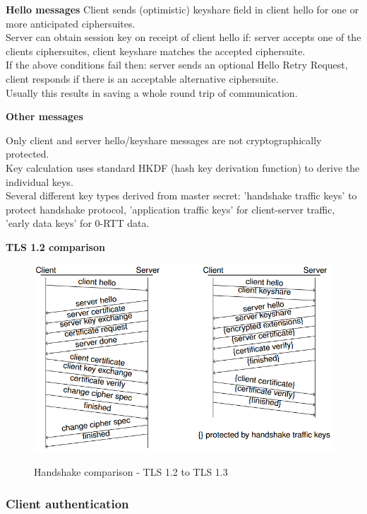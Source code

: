 \documentclass{article}
\begin{document}
\textbf{Hello messages}
Client sends (optimistic) keyshare field in client hello for one or more anticipated ciphersuites.\\
Server can obtain session key on receipt of client hello if: server accepts one of the clients ciphersuites, client keyshare matches the accepted ciphersuite.\\
If the above conditions fail then: server sends an optional Hello Retry Request, client responds if there is an acceptable alternative ciphersuite.\\
Usually this results in saving a whole round trip of communication.

\textbf{Other messages}

Only client and server hello/keyshare messages are not cryptographically protected.\\
Key calculation uses standard HKDF (hash key derivation function) to derive the individual keys.\\
Several different key types derived from master secret: 'handshake traffic keys' to protect handshake protocol, 'application traffic keys' for client-server traffic, 'early data keys' for 0-RTT data.

\textbf{TLS 1.2 comparison}

\begin{figure}[H]
\begin{center}
\includegraphics[scale=0.7]{Images/handshakecomparison.png}
\label{fig:fround}
\caption{Handshake comparison - TLS 1.2 to TLS 1.3}
\end{center}
\end{figure}

\subsubsection{Client authentication}
\end{document}
